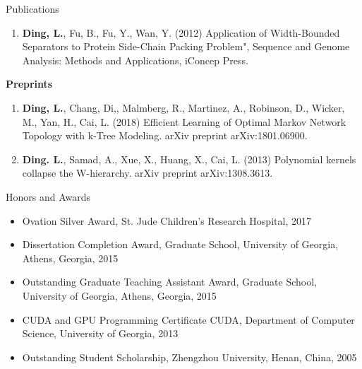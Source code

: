 \documentclass{resume} %
\begin{document}
\begin{rSection}{Publications}
\begin{enumerate}
\item \textbf{Ding, L.}, Fu, B., Fu, Y., Wan, Y. (2012) Application of Width-Bounded Separators to Protein Side-Chain Packing Problem", Sequence and Genome Analysis: Methods and Applications, iConcep Press.
\end{enumerate}


\textbf{Preprints}
\begin{enumerate}
\item \textbf{Ding, L.}, Chang, Di,, Malmberg, R., Martinez, A., Robinson, D., Wicker, M., Yan, H., Cai, L. (2018) Efficient Learning of Optimal Markov Network Topology with k-Tree Modeling. arXiv preprint arXiv:1801.06900.

\item \textbf{Ding. L.}, Samad, A., Xue, X., Huang, X., Cai, L. (2013) Polynomial kernels collapse the W-hierarchy. arXiv preprint arXiv:1308.3613.
\end{enumerate}
\end{rSection}


\begin{rSection}{Honors and Awards}
\begin{itemize}
\item Ovation Silver Award, St. Jude Children’s Research Hospital, 2017
\item Dissertation Completion Award, Graduate School, University of Georgia, Athens, Georgia, 2015
\item Outstanding Graduate Teaching Assistant Award,  Graduate School, University of Georgia, Athens, Georgia, 2015
\item CUDA and GPU Programming Certificate CUDA, Department of Computer Science, University of Georgia, 2013
\item Outstanding Student Scholarship, Zhengzhou University, Henan, China, 2005
\end{itemize}
\end{rSection}
\end{document}
